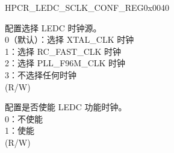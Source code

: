 \begin{register}{H}{PCR\_LEDC\_SCLK\_CONF\_REG}{0x0040}\label{regdesc:PCRLEDCSCLKCONFREG}
%
%
%
%
\regnewline%
\begin{regdesc}\begin{reglist}
\label{fielddesc:PCRLEDCSCLKSEL}\item [PCR\_LEDC\_SCLK\_SEL] 配置选择 LEDC 时钟源。\\
0（默认）：选择 XTAL\_CLK 时钟\\
1：选择 RC\_FAST\_CLK 时钟\\
2：选择 PLL\_F96M\_CLK 时钟\\
3：不选择任何时钟\\ (R/W)
\label{fielddesc:PCRLEDCSCLKEN}\item [PCR\_LEDC\_SCLK\_EN] 配置是否使能 LEDC 功能时钟。\\
0：不使能\\
1：使能\\(R/W)
\end{reglist}\end{regdesc}
\end{register}


